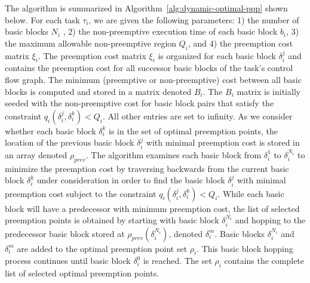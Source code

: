\noindent
\newline
The algorithm is summarized in Algorithm~\ref{alg:dynamic-optimal-ppp} shown below.  For each task $\tau_i$, we are given the following parameters: 1) the number of basic blocks $N_i$ , 2) the non-preemptive execution time of each basic block $b_i$, 3) the maximum allowable non-preemptive region $Q_i$, and 4) the preemption cost matrix $\xi_i$.  The preemption cost matrix $\xi_i$ is organized for each basic block \begin{math}\delta_{i}^{j}\end{math} and contains the preemption cost for all successor basic blocks of the task's control flow graph.  The minimum (preemptive or non-preemptive) cost between all basic blocks is computed and stored in a matrix denoted $B_{i}$.  The $B_{i}$ matrix is initially seeded with the non-preemptive cost for basic block pairs that satisfy the constraint $q_{i}(\delta_{i}^{j},\delta_{i}^{k}) < Q_{i}$. All other entries are set to infinity.  As we consider whether each basic block $\delta_{i}^{k}$ is in the set of optimal preemption points, the location of the previous basic block $\delta_{i}^{j}$ with minimal preemption cost is stored in an array denoted $\rho_{prev}$.  The algorithm examines each basic block from \begin{math}\delta_{i}^{1}\end{math} to \begin{math}\delta_{i}^{N_i}\end{math} to minimize the preemption cost by traversing backwards from the current basic block $\delta_{i}^{k}$ under consideration in order to find the basic block $\delta_{i}^{j}$ with minimal preemption cost subject to the constraint $q_{i}(\delta_{i}^{j},\delta_{i}^{k}) < Q_{i}$.  While each basic block will have a predecessor with minimum preemption cost, the list of selected preemption points is obtained by starting with basic block $\delta_{i}^{N_i}$ and hopping to the predecessor basic block stored at $\rho_{prev}(\delta_{i}^{N_i})$, denoted $\delta_{i}^{m}$.  Basic blocks $\delta_{i}^{N_i}$ and $\delta_{i}^{m}$ are added to the optimal preemption point set $\rho_{i}$.  This basic block hopping process continues until basic block $\delta_{i}^{0}$ is reached.  The set $\rho_{i}$ contains the complete list of selected optimal preemption points.
